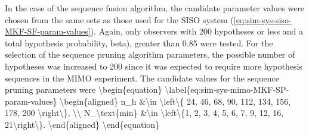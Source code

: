  In the case of the sequence fusion algorithm, the candidate parameter values were chosen from the same sets as those used for the SISO system (\ref{eq:sim-sys-siso-MKF-SF-param-values}). Again, only observers with 200 hypotheses or less and a total hypothesis probability, \gls{beta), greater than 0.85 were tested. For the selection of the sequence pruning algorithm parameters, the possible number of hypotheses was increased to 200 since it was expected to require more hypothesis sequences in the MIMO experiment. The candidate values for the sequence pruning parameters were
\begin{equation} \label{eq:sim-sys-mimo-MKF-SP-param-values}
	\begin{aligned}
		n_h &\in \left\{ 24, 46, 68, 90, 112, 134, 156, 178, 200 \right\},  \\
		N_\text{min} &\in \left\{1, 2, 3, 4, 5, 6, 7, 9, 12, 16, 21\right\}.
	\end{aligned}
\end{equation}

}
